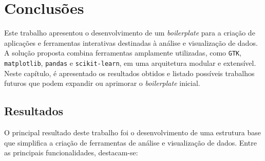 
\chapter{Conclusões}
\label{cap:4:conclusoes}

Este trabalho apresentou o desenvolvimento de um \textit{boilerplate} para a criação de aplicações e ferramentas interativas destinadas à análise e visualização de dados. A solução proposta combina ferramentas amplamente utilizadas, como \texttt{GTK}, \texttt{matplotlib}, \texttt{pandas} e \texttt{scikit-learn}, em uma arquitetura modular e extensível. Neste capítulo, é apresentado os resultados obtidos e listado possíveis trabalhos futuros que podem expandir ou aprimorar o \textit{boilerplate} inicial.

\section{Resultados}

O principal resultado deste trabalho foi o desenvolvimento de uma estrutura base que simplifica a criação de ferramentas de análise e visualização de dados. Entre as principais funcionalidades, destacam-se:

